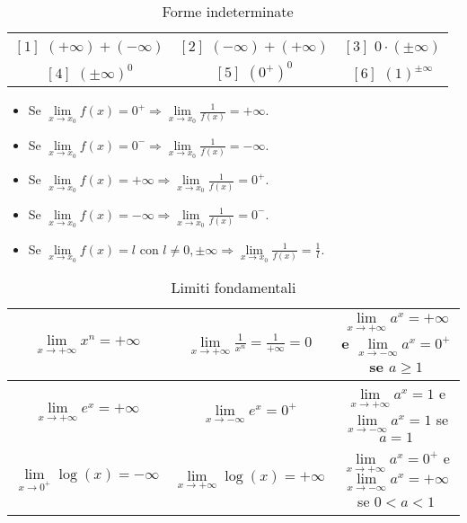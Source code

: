 \begin{table}[h!]
	\setlength{\tabcolsep}{7pt}
	\renewcommand{\arraystretch}{1.5}
	\centering
	\begin{tabular}{|c c c|}
		\hline
		$[1]$ $(+\infty) + (-\infty)$ & $[2]$ $(-\infty) + (+\infty)$ & $[3]$ $0 \cdot (\pm \infty)$ \\
		$[4]$ $(\pm \infty)^0$ & $[5]$ $(0^+)^0$ & $[6]$ $(1)^{\pm \infty}$\\ 
		\hline
	\end{tabular}
	\caption{Forme indeterminate}
\end{table}

\begin{itemize}
	\item Se $\lim\limits_{x\to x_0}f(x) = 0^+ \Longrightarrow \lim\limits_{x\to x_0}\frac{1}{f(x)} = +\infty$.
	\item Se $\lim\limits_{x\to x_0}f(x) = 0^- \Longrightarrow \lim\limits_{x\to x_0}\frac{1}{f(x)} = -\infty$.
	\item Se $\lim\limits_{x\to x_0}f(x) = +\infty \Longrightarrow \lim\limits_{x\to x_0}\frac{1}{f(x)} = 0^+$.
	\item Se $\lim\limits_{x\to x_0}f(x) = -\infty \Longrightarrow \lim\limits_{x\to x_0}\frac{1}{f(x)} = 0^-$.
	\item Se $\lim\limits_{x\to x_0}f(x) = l$ con $l \neq 0, \pm\infty \Longrightarrow \lim\limits_{x\to x_0}\frac{1}{f(x)} = \frac{1}{l}$.
\end{itemize}

\begin{table}[h!]
	\setlength{\tabcolsep}{7pt}
	\renewcommand{\arraystretch}{1.5}
	\centering
	\begin{tabular}{|c c|c|}
		\hline
		$\lim\limits_{x\to +\infty}x^n = +\infty$ & $\lim\limits_{x\to +\infty}\frac{1}{x^n} = \frac{1}{+\infty} = 0$ & $\lim\limits_{x\to +\infty}a^x = +\infty$ e $\lim\limits_{x\to -\infty}a^x = 0^+$ se $a \geq 1$ \\\hline
		$\lim\limits_{x\to +\infty}e^x = +\infty$ & $\lim\limits_{x\to -\infty}e^x = 0^+$ & $\lim\limits_{x\to +\infty}a^x = 1$ e $\lim\limits_{x\to -\infty}a^x = 1$ se $a = 1$  \\\hline
		$\lim\limits_{x\to 0^+}\log(x) = -\infty$ & $\lim\limits_{x\to +\infty}\log(x) = +\infty$ & $\lim\limits_{x\to +\infty}a^x = 0^+$ e $\lim\limits_{x\to -\infty}a^x = +\infty$ se $0 < a < 1$ \\
		\hline
	\end{tabular}
	\vspace{-5pt}
	\caption{Limiti fondamentali}
\end{table}

